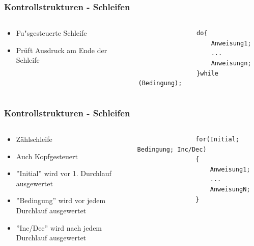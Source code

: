 \begin{frame}[fragile]
	\frametitle{Kontrollstrukturen - Schleifen}
	\begin{columns}
		\begin{column}{0.5\textwidth}
		\small
			\begin{itemize}
			  \item Fu"sgesteuerte Schleife
			  \item Pr\"uft Ausdruck am Ende der Schleife 
			\end{itemize}
		\end{column}
		\begin{column}{0.5\textwidth}
			\begin{lstlisting}
				do{
					Anweisung1;
					...
					Anweisungn;
				}while (Bedingung);
			\end{lstlisting}
		\end{column}
	\end{columns}
\end{frame}

\begin{frame}[fragile]
	\frametitle{Kontrollstrukturen - Schleifen}
	\begin{columns}
		\begin{column}{0.5\textwidth}
		\small
			\begin{itemize}
				  \item Z\"ahlschleife
				  \item Auch Kopfgesteuert
				  \item ''Initial'' wird vor 1. Durchlauf ausgewertet
				  \item ''Bedingung'' wird vor jedem Durchlauf ausgewertet
				  \item ''Inc/Dec'' wird nach jedem Durchlauf ausgewertet
				\end{itemize}
			\end{column}
		\begin{column}{0.5\textwidth}
			\begin{lstlisting}
				for(Initial; Bedingung; Inc/Dec)
				{
					Anweisung1;
					...
					AnweisungN;
				}
			\end{lstlisting}
		\end{column}
	\end{columns}
\end{frame}

